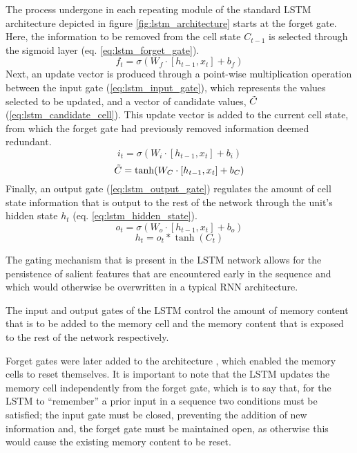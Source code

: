 \documentclass[../../fyp.tex]{subfiles}
\begin{document}
The process undergone in each repeating module of the standard LSTM architecture depicted in figure \ref{fig:lstm_architecture} starts at the forget gate. Here, the information to be removed from the cell state $C_{t-1}$ is selected through the sigmoid layer (eq. \ref{eq:lstm_forget_gate}).
\begin{equation} \label{eq:lstm_forget_gate}
	f_t = \sigma(W_f\cdot[h_{t-1},x_t] + b_f)
\end{equation}
Next, an update vector is produced through a point-wise multiplication operation between the input gate (\ref{eq:lstm_input_gate}), which represents the values selected to be updated, and a vector of candidate values, $\Tilde{C}$ (\ref{eq:lstm_candidate_cell}). This update vector is added to the current cell state, from which the forget gate had previously removed information deemed redundant.
\begin{equation} \label{eq:lstm_input_gate}
	i_t = \sigma(W_i\cdot[h_{t-1},x_t] + b_i)
\end{equation}
\begin{equation} \label{eq:lstm_candidate_cell}
	\Tilde{C} = \tanh(W_C\cdot[h_{t-1},x_t] + b_C)
\end{equation}
Finally, an output gate (\ref{eq:lstm_output_gate}) regulates the amount of cell state information that is output to the rest of the network through the unit's hidden state $h_t$ (eq. \ref{eq:lstm_hidden_state}).
\begin{equation} \label{eq:lstm_output_gate}
	o_t = \sigma(W_o\cdot[h_{t-1},x_t] + b_o)
\end{equation}
\begin{equation} \label{eq:lstm_hidden_state}
	h_t = o_t*\tanh(C_t)
\end{equation}

The gating mechanism that is present in the LSTM network allows for the persistence of salient features that are encountered early in the sequence and which would otherwise be overwritten in a typical RNN architecture.

The input and output gates of the LSTM control the amount of memory content that is to be added to the memory cell and the memory content that is exposed to the rest of the network respectively.

Forget gates were later added to the architecture \cite{gers2000}, which enabled the memory cells to reset themselves. It is important to note that the LSTM updates the memory cell independently from the forget gate, which is to say that, for the LSTM to \enquote{remember} a prior input in a sequence two conditions must be satisfied; the input gate must be closed, preventing the addition of new information and, the forget gate must be maintained open, as otherwise this would cause the existing memory content to be reset.
\end{document}
